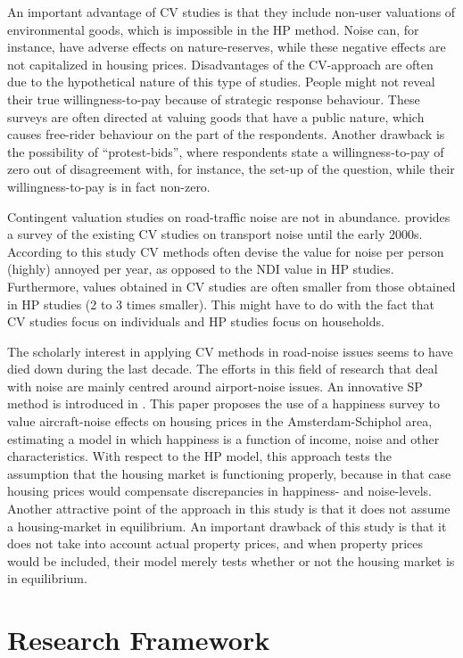 \documentclass[a4paper]{scrartcl}
\begin{document}
An important advantage of CV studies is that they include non-user valuations of environmental goods, which is impossible in the HP method. Noise can, for instance, have adverse effects on nature-reserves, while these negative effects are not capitalized in housing prices. Disadvantages of the CV-approach are often due to the hypothetical nature of this type of studies. People might not reveal their true willingness-to-pay because of strategic response behaviour. These surveys are often directed at valuing goods that have a public nature, which causes free-rider behaviour on the part of the respondents. Another drawback is the possibility of “protest-bids”, where respondents state a willingness-to-pay of zero out of disagreement with, for instance, the set-up of the question, while their willingness-to-pay is in fact non-zero.

Contingent valuation studies on road-traffic noise are not in abundance. \cite{Navrud2002} provides a survey of the existing CV studies on transport noise until the early 2000s. According to this study CV methods often devise the value for noise per person (highly) annoyed per year, as opposed to the NDI value in HP studies. Furthermore, values obtained in CV studies are often smaller from those obtained in HP studies (2 to 3 times smaller). This might have to do with the fact that CV studies focus on individuals and HP studies focus on households. 

The scholarly interest in applying CV methods in road-noise issues seems to have died down during the last decade. The efforts in this field of research that deal with noise are mainly centred around airport-noise issues. An innovative SP method is introduced in \cite{VanPraag2005}. This paper proposes the use of a happiness survey to value aircraft-noise effects on housing prices in the Amsterdam-Schiphol area, estimating a model in which happiness is a function of income, noise and other characteristics. With respect to the HP model, this approach tests the assumption that the housing market is functioning properly, because in that case housing prices would compensate discrepancies in happiness- and noise-levels. Another attractive point of the approach in this study is that it does not assume a housing-market in equilibrium. An important drawback of this study is that it does not take into account actual property prices, and when property prices would be included, their model merely tests whether or not the housing market is in equilibrium.

\section{Research Framework}
\end{document}
